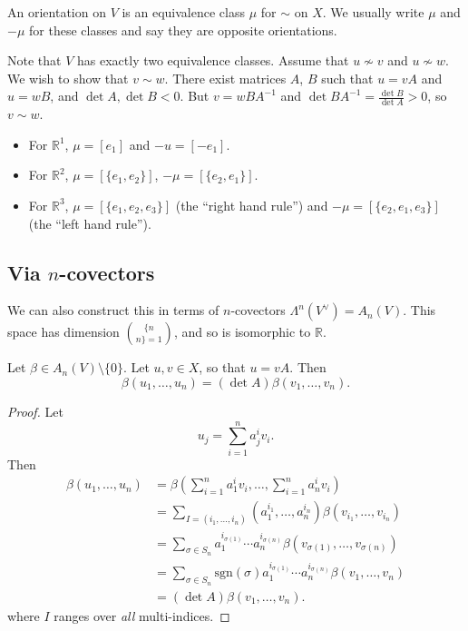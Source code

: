 \begin{defn}
An orientation on $V$ is an equivalence class $\mu$ for $\sim$ on $X$.
We usually write $\mu$ and $-\mu$ for these classes and say they are
opposite orientations.
\end{defn}

Note that $V$ has exactly two equivalence classes. Assume that
$u \nsim v$ and $u \nsim w$. We wish to show that $v \sim w$.
There exist matrices $A$, $B$ such that $u = vA$ and $u = w B$, and
$\det A, \det B < 0$. But $v = w BA^{-1}$ and
$\det BA^{-1} = \frac{\det B}{\det A} > 0$, so $v \sim w$.

\begin{xmpl}
\begin{itemize}
  \item{
    For $\mathbb{R}^1$, $\mu = [e_1]$ and $-u = [-e_1]$.
  }
  \item{
    For $\mathbb{R}^2$, $\mu = [\{e_1, e_2\}]$,
    $-\mu = [\{e_2, e_1\}]$.
  }
  \item{
    For $\mathbb{R}^3$, $\mu = [\{e_1, e_2, e_3\}]$
    (the ``right hand rule'') and
    $-\mu = [\{e_2, e_1, e_3\}]$ (the ``left hand rule'').
  }
\end{itemize}
\end{xmpl}

\subsection{Via $n$-covectors}
We can also construct this in terms of $n$-covectors
$\Lambda^n(V^\vee) = A_n(V)$. This space has dimension
$\{ n \choose n \} = 1$, and so is isomorphic to $\mathbb{R}$.

\begin{lemma}
Let $\beta \in A_n(V) \setminus \{ 0 \}$. Let
$u, v \in X$, so that $u = vA$. Then
$$
  \beta(u_1, \dots, u_n)
= (\det A)\beta(v_1, \dots, v_n).
$$
\end{lemma}
\begin{proof}
Let
$$
  u_j
= \sum_{i=1}^n
    a^i_j v_i.
$$
Then
\begin{align*}
   \beta(u_1, \dots, u_n)
&= \beta
     \left(
       \sum_{i=1}^n
         a_1^i v_i,
       \dots,
       \sum_{i=1}^n
         a_n^i v_i
     \right) \\
&= \sum_{I = (i_1, \dots, i_n)}
     (a_1^{i_1}, \dots, a_n^{i_n})
     \beta(v_{i_1}, \dots, v_{i_n}) \\
&= \sum_{\sigma \in S_n}
     a_1^{i_{\sigma(1)}}
     \cdots
     a_n^{i_{\sigma(n)}}
     \beta(
       v_{\sigma(1)}, \dots, v_{\sigma(n)}
     ) \\
&= \sum_{\sigma \in S_n}
     \mathrm{sgn}(\sigma)
       a_1^{i_{\sigma(1)}}
       \cdots
       a_n^{i_{\sigma(n)}}
       \beta(v_1, \dots, v_n) \\
&= (\det A)
   \beta(v_1, \dots, v_n).
\end{align*}
where $I$ ranges over \emph{all} multi-indices.
\end{proof}
